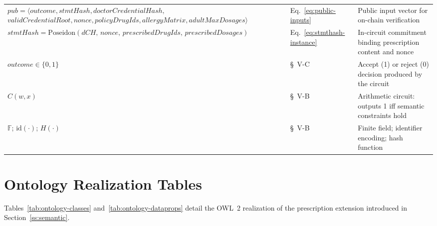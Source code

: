 \documentclass[journal]{IEEEtran}
\begin{document}
\begin{table}[!ht]
\begin{tabular}{p{4.5cm} p{1.4cm} p{10.5cm}}
$\mathit{pub} = \langle \mathit{outcome}, \mathit{stmtHash}, \mathit{doctorCredentialHash},$\newline $\mathit{validCredentialRoot}, \mathit{nonce}, \mathit{policyDrugIds}, \mathit{allergyMatrix}, \mathit{adultMaxDosages} \rangle$ & Eq.~\ref{eq:public-inputs} & Public input vector for on-chain verification \\

$\mathit{stmtHash} = \mathrm{Poseidon}(\mathit{dCH},\,\mathit{nonce},\,\mathit{prescribedDrugIds},\,\mathit{prescribedDosages})$ & Eq.~\ref{eq:stmthash-instance} & In-circuit commitment binding prescription content and nonce \\

$\mathit{outcome} \in \{0, 1\}$ & \S~V-C & Accept (1) or reject (0) decision produced by the circuit \\
$C(w, x)$ & \S~V-B & Arithmetic circuit: outputs 1 iff semantic constraints hold \\
$\mathbb{F}$;\; $\mathrm{id}(\cdot)$;\; $H(\cdot)$ & \S~V-B & Finite field; identifier encoding; hash function \\
\bottomrule
\end{tabular}
\end{table}


\section{Ontology Realization Tables}
\label{app:ontology-tables}

Tables~\ref{tab:ontology-classes} and~\ref{tab:ontology-dataprops}
detail the OWL~2 realization of the prescription extension introduced
in Section~\ref{ss:semantic}.
\end{document}
